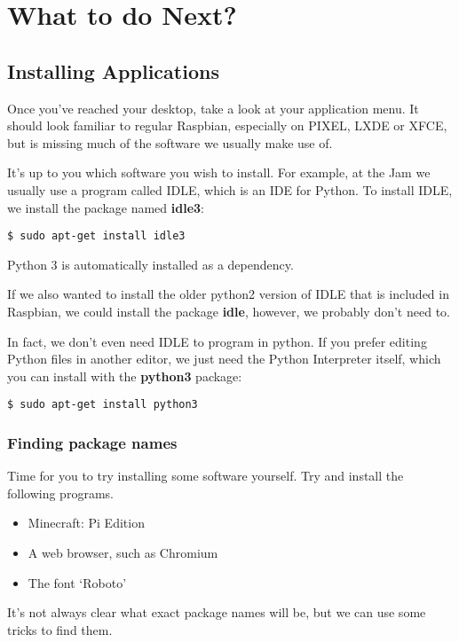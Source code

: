 \section{What to do Next?}

	\subsection*{Installing Applications}

		Once you've reached your desktop, take a look at your application menu. It should look familiar to regular Raspbian, especially on PIXEL, LXDE or XFCE, but is missing much of the software we usually make use of.
		
		It's up to you which software you wish to install. For example, at the Jam we usually use a program called IDLE, which is an IDE for Python. To install IDLE, we install the package named \textbf{idle3}:
\begin{lstlisting}
$ sudo apt-get install idle3
\end{lstlisting}

		Python 3 is automatically installed as a dependency.
		
		If we also wanted to install the older python2 version of IDLE that is included in Raspbian, we could install the package \textbf{idle}, however, we probably don't need to.
		
		In fact, we don't even need IDLE to program in python. If you prefer editing Python files in another editor, we just need the Python Interpreter itself, which you can install with the \textbf{python3} package:
\begin{lstlisting}
$ sudo apt-get install python3
\end{lstlisting}

		\subsubsection*{Finding package names}
		
			Time for you to try installing some software yourself. Try and install the following programs.
	
	\begin{itemize}[nosep]
		\item Minecraft: Pi Edition
		\item A web browser, such as Chromium
		\item The font `Roboto'
	\end{itemize}
	
			It's not always clear what exact package names will be, but we can use some tricks to find them.
			

